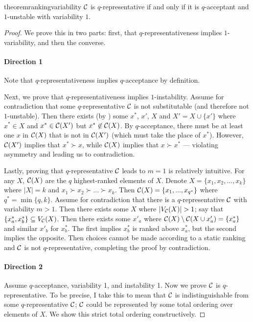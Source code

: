 \begin{restatable}{theorem}{rankingvariability}
\label{thm:ranking-variability}
$\mathcal{C}$ is $q$-representative if and only if it is $q$-acceptant and $1$-unstable with variability $1$.
\end{restatable}
\begin{proof}
We prove this in two parts: first, that $q$-representativeness implies $1$-variability, and then the converse.

\paragraph{Direction 1} %
Note that $q$-representativeness implies $q$-acceptance by definition.

Next, we prove that $q$-representativeness implies $1$-instability. Assume for contradiction that some $q$-representative $\mathcal{C}$ is not substitutable (and therefore not $1$-unstable). Then there exists (by ) some $x^*$, $x'$, $X$ and $X' = X \cup \{x'\}$ where $x^* \in X$ and $x^* \in \mathcal{C}(X')$ but $x^* \not\in \mathcal{C}(X)$. By $q$-acceptance, there must be at least one $x$ in $\mathcal{C}(X)$ that is not in $\mathcal{C}(X')$ (which must take the place of $x^*$). However, $\mathcal{C}(X')$ implies that $x^* \succ x$, while $\mathcal{C}(X)$ implies that $x \succ x^*$ --- violating asymmetry and leading us to contradiction.

Lastly, proving that $q$-representative $\mathcal{C}$ leads to $m=1$ is relatively intuitive. For any $X$, $\mathcal{C}(X)$ are the $q$ highest-ranked elements of $X$. Denote $X = \{x_1, x_2, ..., x_k\}$ where $|X| = k$ and $x_1 \succ x_2 \succ ...\succ x_k$. Then $\mathcal{C}(X) = \{x_1, ..., x_{q^*}\}$ where $q^* = \min\{q, k\}$.
Assume for contradiction that there is a $q$-representative $\mathcal{C}$ with variability $m > 1$. Then there exists some $X$ where $|V_{\mathcal{C}}(X)| > 1$; say that $\{x^*_a, x^*_b\} \subseteq V_{\mathcal{C}}(X)$. Then there exists some $x'_a$ where $\mathcal{C}(X) \setminus \mathcal{C}(X \cup x'_a) = \{x^*_a\}$ and similar $x'_b$ for $x^*_b$. The first implies $x^*_b$ is ranked above $x^*_a$, but the second implies the opposite. Then choices cannot be made according to a static ranking and $\mathcal{C}$ is not $q$-representative, completing the proof by contradiction. %

\paragraph{Direction 2}
Assume $q$-acceptance, variability 1, and instability 1. Now we prove $\mathcal{C}$ is $q$-representative. To be precise, I take this to mean that $\mathcal{C}$ is indistinguishable from some $q$-representative $\mathcal{C}$; $\mathcal{C}$ could be represented by some total ordering over elements of $X$. We show this strict total ordering constructively.


\end{proof}
